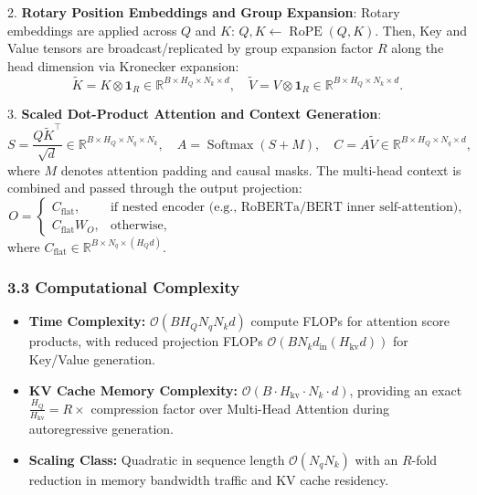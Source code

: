 2. \textbf{Rotary Position Embeddings and Group Expansion}:
Rotary embeddings are applied across $Q$ and $K$: $Q, K \leftarrow \operatorname{RoPE}(Q, K)$. Then, Key and Value tensors are broadcast/replicated by group expansion factor $R$ along the head dimension via Kronecker expansion:
\begin{equation}
\widetilde{K} = K \otimes \mathbf{1}_R \in \mathbb{R}^{B \times H_Q \times N_k \times d}, \quad \widetilde{V} = V \otimes \mathbf{1}_R \in \mathbb{R}^{B \times H_Q \times N_k \times d}.
\end{equation}

3. \textbf{Scaled Dot-Product Attention and Context Generation}:
\begin{equation}
S = \frac{Q \widetilde{K}^\top}{\sqrt{d}} \in \mathbb{R}^{B \times H_Q \times N_q \times N_k}, \quad A = \operatorname{Softmax}(S + M), \quad C = A \widetilde{V} \in \mathbb{R}^{B \times H_Q \times N_q \times d},
\end{equation}
where $M$ denotes attention padding and causal masks. The multi-head context is combined and passed through the output projection:
\begin{equation}
O = \begin{cases}
C_{\text{flat}}, & \text{if nested encoder (e.g., RoBERTa/BERT inner self-attention)}, \\
C_{\text{flat}} W_O, & \text{otherwise},
\end{cases}
\end{equation}
where $C_{\text{flat}} \in \mathbb{R}^{B \times N_q \times (H_Q d)}$.

\subsubsection*{3.3 Computational Complexity}
\begin{itemize}
    \item \textbf{Time Complexity:} $\mathcal{O}\left(B H_Q N_q N_k d\right)$ compute FLOPs for attention score products, with reduced projection FLOPs $\mathcal{O}\left(B N_k d_{\text{in}} (H_{\text{kv}} d)\right)$ for Key/Value generation.
    \item \textbf{KV Cache Memory Complexity:} $\mathcal{O}\left(B \cdot H_{\text{kv}} \cdot N_k \cdot d\right)$, providing an exact $\frac{H_Q}{H_{\text{kv}}} = R\times$ compression factor over Multi-Head Attention during autoregressive generation.
    \item \textbf{Scaling Class:} Quadratic in sequence length $\mathcal{O}(N_q N_k)$ with an $R$-fold reduction in memory bandwidth traffic and KV cache residency.
\end{itemize}

